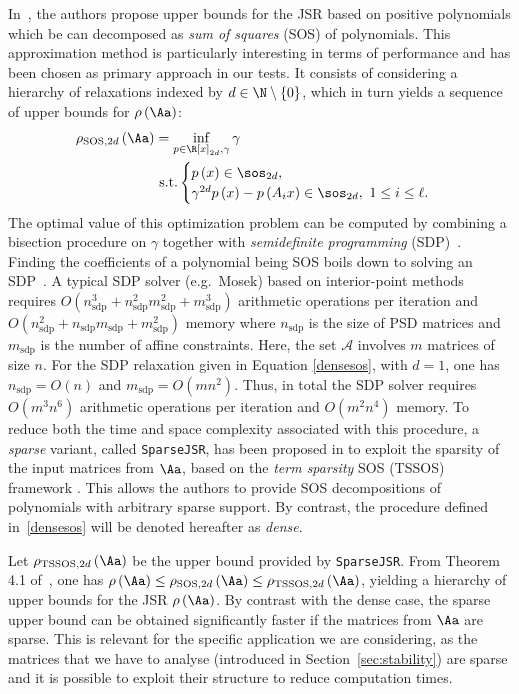 In~\cite{parrilo}, the authors propose upper bounds for the JSR based on positive polynomials which be can decomposed as \emph{sum of squares} (SOS) of polynomials.
This approximation method is particularly interesting in terms of performance and has been chosen as primary approach in our tests. 
%
It consists of considering a hierarchy of relaxations indexed by $d\in\N\setminus \left\{ 0 \right\}$, which in turn yields a sequence of upper bounds for $\rho\left(\Aa\right)$:
\begin{align}
    \label{densesos}
    \rho_{\textrm{SOS},2d}\left(\Aa\right) &= \inf_{p\in\R\left[x\right]_{2d},\gamma}  \gamma \\
    &\textrm{ s.t.} 
    \begin{cases} 
        p\left(x\right)\in\sos_{2d},\\
        \gamma^{2d}p\left(x\right)-p\left(A_ix\right)\in\sos_{2d},\ 1 \leq i \leq \ell.
    \end{cases} \nonumber
\end{align}
%
The optimal value of this optimization problem can be computed by combining a bisection procedure on $\gamma$ together with \emph{semidefinite programming} (SDP)~\cite{wolkowicz2012handbook}.
Finding the coefficients of a polynomial being SOS boils down to solving an SDP~\cite{re2, parrilo2000structured, lasserre2001global}.
A typical SDP solver (e.g.~Mosek) based on interior-point methods requires $O(n_{\text{sdp}}^3 + n_{\text{sdp}}^2 m_{\text{sdp}}^2 + m_{\text{sdp}}^3)$ arithmetic operations per iteration and $O(n_{\text{sdp}}^2 + n_{\text{sdp}} m_{\text{sdp}} + m_{\text{sdp}}^2)$ memory where $n_{\text{sdp}}$ is the size of PSD matrices and $m_{\text{sdp}}$ is the number of affine constraints.
Here, the set $\mathcal{A}$ involves $m$ matrices of size $n$.
For the SDP relaxation given in Equation \eqref{densesos}, with $d = 1$, one has $n_{\text{sdp}} = O(n)$ and $m_{\text{sdp}} = O(m n^2)$.
Thus, in total the SDP solver requires $O(m^3 n^6)$ arithmetic operations per iteration and $O(m^2 n^4)$ memory.
%
To reduce both the time and space complexity associated with this procedure, a \emph{sparse} variant, called \texttt{SparseJSR}, has been proposed in \cite{sparsejsr} to exploit the sparsity of the input matrices from $\Aa$, based on the \emph{term sparsity} SOS (TSSOS) framework \cite{tssos}.
This allows the authors to provide SOS decompositions of polynomials with arbitrary sparse support.
By contrast, the procedure defined in~\eqref{densesos} will be denoted hereafter as \emph{dense}.

Let $\rho_{\textrm{TSSOS},2d}\left(\Aa\right)$ be the upper bound provided by \texttt{SparseJSR}.
From Theorem 4.1 of~\cite{sparsejsr}, one has $\rho\left(\Aa\right) \leq \rho_{\textrm{SOS},2d}\left(\Aa\right) \leq \rho_{\textrm{TSSOS},2d}\left(\Aa\right)$, yielding a hierarchy of upper bounds for the JSR $\rho\left(\Aa\right)$.
By contrast with the dense case, the sparse upper bound can be obtained significantly faster if the matrices from $\Aa$ are sparse.
This is relevant for the specific application we are considering, as the matrices that we have to analyse (introduced in Section~\ref{sec:stability}) are sparse and it is possible to exploit their structure to reduce computation times.
